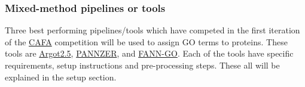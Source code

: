 \subsubsection{Mixed-method pipelines or tools}
Three best performing pipelines/tools which have competed in the first iteration of the \href{http://biofunctionprediction.org}{CAFA} competition will be used to assign GO terms to proteins. These tools are \href{http://www.medcomp.medicina.unipd.it/Argot2-5/}{Argot2.5}, \href{http://ekhidna.biocenter.helsinki.fi/pannzer}{PANNZER}, and \href{http://montana.informatics.indiana.edu/fanngo/fanngo.html}{FANN-GO}. Each of the tools have specific requirements, setup instructions and pre-processing steps. These all will be explained in the setup section.